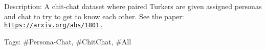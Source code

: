 Description\+: A chit-\/chat dataset where paired Turkers are given assigned personas and chat to try to get to know each other. See the paper\+: \href{https://arxiv.org/abs/1801.07243}{\tt https\+://arxiv.\+org/abs/1801.}

Tags\+: \#\+Persona-\/\+Chat, \#\+Chit\+Chat, \#\+All 